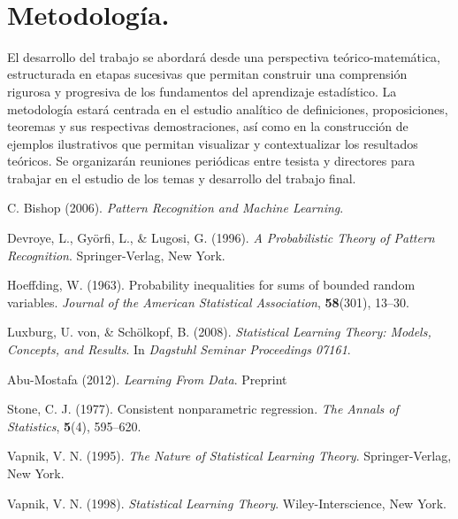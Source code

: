 \documentclass[12pt]{article}
\begin{document}
\

\section{Metodología.}


El desarrollo del trabajo se abordará desde una perspectiva teórico-matemática, estructurada en etapas sucesivas que permitan construir una comprensión rigurosa y progresiva de los fundamentos del aprendizaje estadístico. La metodología estará centrada en el estudio analítico de definiciones, proposiciones, teoremas y sus respectivas demostraciones, así como en la construcción de ejemplos ilustrativos que permitan visualizar y contextualizar los resultados teóricos. Se organizarán reuniones periódicas entre tesista y directores para trabajar en el estudio de los temas y desarrollo del trabajo final.






\begin{thebibliography}{20}
\parskip=0.1cm

 C. Bishop  (2006). \textit{ Pattern Recognition and Machine Learning}.

 Devroye, L., Györfi, L., \& Lugosi, G. (1996). \textit{A Probabilistic Theory of Pattern Recognition}. Springer-Verlag, New York.

Hoeffding, W. (1963). Probability inequalities for sums of bounded random variables. \textit{Journal of the American Statistical Association}, \textbf{58}(301), 13–30.

 Luxburg, U. von, \& Schölkopf, B. (2008). \textit{Statistical Learning Theory: Models, Concepts, and Results}. In \textit{Dagstuhl Seminar Proceedings 07161}.

 Abu-Mostafa  (2012). \textit{Learning From Data}. Preprint

 Stone, C. J. (1977). Consistent nonparametric regression. \textit{The Annals of Statistics}, \textbf{5}(4), 595–620.

Vapnik, V. N. (1995). \textit{The Nature of Statistical Learning Theory}. Springer-Verlag, New York.

 Vapnik, V. N. (1998). \textit{Statistical Learning Theory}. Wiley-Interscience, New York.






\end{thebibliography}
\end{document}
